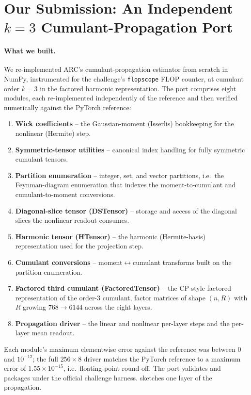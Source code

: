 \documentclass[11pt]{article}
\theoremstyle{remark}
\begin{document}
\section{Our Submission: An Independent $k{=}3$ Cumulant-Propagation Port}
\label{sec:submission}

\paragraph{What we built.}
We re-implemented ARC's cumulant-propagation estimator from scratch in NumPy,
instrumented for the challenge's \texttt{flopscope} FLOP counter, at cumulant
order $k=3$ in the factored harmonic representation. The port comprises eight
modules, each re-implemented independently of the reference and then verified
numerically against the PyTorch reference:
\begin{enumerate}
  \item \textbf{Wick coefficients} -- the Gaussian-moment (Isserlis) bookkeeping
  for the nonlinear (Hermite) step.
  \item \textbf{Symmetric-tensor utilities} -- canonical index handling for
  fully symmetric cumulant tensors.
  \item \textbf{Partition enumeration} -- integer, set, and vector partitions,
  i.e.\ the Feynman-diagram enumeration that indexes the moment-to-cumulant and
  cumulant-to-moment conversions.
  \item \textbf{Diagonal-slice tensor (DSTensor)} -- storage and access of the
  diagonal slices the nonlinear readout consumes.
  \item \textbf{Harmonic tensor (HTensor)} -- the harmonic (Hermite-basis)
  representation used for the projection step.
  \item \textbf{Cumulant conversions} -- moment$\leftrightarrow$cumulant
  transforms built on the partition enumeration.
  \item \textbf{Factored third cumulant (FactoredTensor)} -- the CP-style
  factored representation of the order-3 cumulant, factor matrices of shape
  $(n, R)$ with $R$ growing $768\to6144$ across the eight layers.
  \item \textbf{Propagation driver} -- the linear and nonlinear per-layer steps
  and the per-layer mean readout.
\end{enumerate}
Each module's maximum elementwise error against the reference was between $0$
and $10^{-12}$; the full $256\times8$ driver matches the PyTorch reference to a
maximum error of $1.55\times10^{-15}$, i.e.\ floating-point round-off. The port
validates and packages under the official challenge harness.
 sketches one layer of the propagation.
\end{document}
